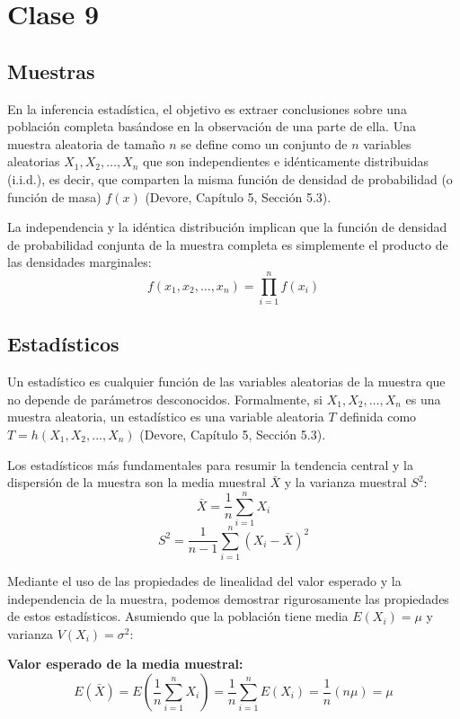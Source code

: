 \chapter{Clase 9}

\section{Muestras}

En la inferencia estadística, el objetivo es extraer conclusiones sobre una población completa basándose en la observación de una parte de ella. Una muestra aleatoria de tamaño $n$ se define como un conjunto de $n$ variables aleatorias $X_1, X_2, \dots, X_n$ que son independientes e idénticamente distribuidas (i.i.d.), es decir, que comparten la misma función de densidad de probabilidad (o función de masa) $f(x)$ (Devore, Capítulo 5, Sección 5.3). 

La independencia y la idéntica distribución implican que la función de densidad de probabilidad conjunta de la muestra completa es simplemente el producto de las densidades marginales:
$$ f(x_1, x_2, \dots, x_n) = \prod_{i=1}^{n} f(x_i) $$

\section{Estadísticos}

Un estadístico es cualquier función de las variables aleatorias de la muestra que no depende de parámetros desconocidos. Formalmente, si $X_1, X_2, \dots, X_n$ es una muestra aleatoria, un estadístico es una variable aleatoria $T$ definida como $T = h(X_1, X_2, \dots, X_n)$ (Devore, Capítulo 5, Sección 5.3). 

Los estadísticos más fundamentales para resumir la tendencia central y la dispersión de la muestra son la media muestral $\bar{X}$ y la varianza muestral $S^2$:
$$ \bar{X} = \frac{1}{n} \sum_{i=1}^{n} X_i $$
$$ S^2 = \frac{1}{n-1} \sum_{i=1}^{n} (X_i - \bar{X})^2 $$

Mediante el uso de las propiedades de linealidad del valor esperado y la independencia de la muestra, podemos demostrar rigurosamente las propiedades de estos estadísticos. Asumiendo que la población tiene media $E(X_i) = \mu$ y varianza $V(X_i) = \sigma^2$:

\textbf{Valor esperado de la media muestral:}
$$ E(\bar{X}) = E\left( \frac{1}{n} \sum_{i=1}^{n} X_i \right) = \frac{1}{n} \sum_{i=1}^{n} E(X_i) = \frac{1}{n} (n\mu) = \mu $$

